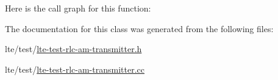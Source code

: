 Here is the call graph for this function\+:




The documentation for this class was generated from the following files\+:\begin{DoxyCompactItemize}
\item 
lte/test/\hyperlink{lte-test-rlc-am-transmitter_8h}{lte-\/test-\/rlc-\/am-\/transmitter.\+h}\item 
lte/test/\hyperlink{lte-test-rlc-am-transmitter_8cc}{lte-\/test-\/rlc-\/am-\/transmitter.\+cc}\end{DoxyCompactItemize}
